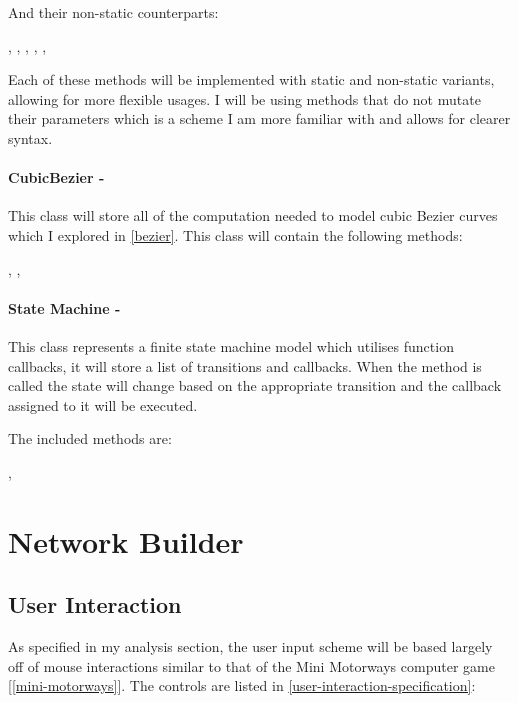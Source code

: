         And their non-static counterparts:

        ,
        ,
        ,
        ,
        ,

        Each of these methods will be implemented with static and non-static variants, allowing for more flexible usages. I will be using methods that do not mutate their parameters which is a scheme I am more familiar with and allows for clearer syntax.

        \paragraph{CubicBezier -}

        This class will store all of the computation needed to model cubic Bezier curves which I explored in \autoref{bezier}.
        This class will contain the following methods:

        , , 

        \paragraph{State Machine -}

        This class represents a finite state machine model which utilises function callbacks, it will store a list of transitions and callbacks. When the  method is called the state will change based on the appropriate transition and the callback assigned to it will be executed.

        The included methods are:

        , 


\section{Network Builder}

    \subsection{User Interaction}

    As specified in my analysis section, the user input scheme will be based largely off of mouse interactions similar to that of the Mini Motorways computer game [\autoref{mini-motorways}]. The controls are listed in \autoref{user-interaction-specification}:

